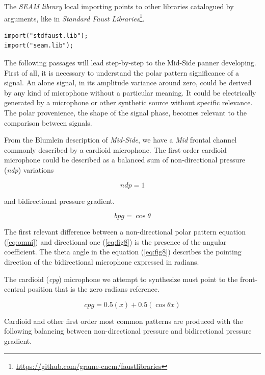 \documentclass{article}
\begin{document}
The \emph{SEAM library} local importing points to other libraries catalogued
by arguments, like in \emph{Standard Faust Libraries}\footnote{
\url{https://github.com/grame-cncm/faustlibraries}}.

\begin{lstlisting}
import("stdfaust.lib");
import("seam.lib");
\end{lstlisting}

The following passages will lead step-by-step to the Mid-Side panner developing. First of all, it is necessary to understand the polar pattern significance of a signal. An alone signal, in its amplitude variance around zero, could be derived by any kind of microphone without a particular meaning. It could be electrically generated by a microphone or other synthetic source without specific relevance. The polar provenience, the shape of the signal phase, becomes relevant to the comparison between signals.

From the Blumlein description of \emph{Mid-Side}, we have a \emph{Mid} frontal channel commonly described by a cardioid microphone. The first-order cardioid microphone could be described as a balanced sum of non-directional pressure (\emph{ndp}) variations

\begin{equation}
ndp = 1
\label{eq:omni}
\end{equation}

and bidirectional pressure gradient.

\begin{equation}
bpg = \cos\theta
\label{eq:fig8}
\end{equation}

The first relevant difference between a non-directional polar pattern equation (\ref{eq:omni}) and directional one (\ref{eq:fig8}) is the presence of the angular coefficient. The theta angle in the equation (\ref{eq:fig8}) describes the pointing direction of the bidirectional microphone expressed in radians.

The cardioid (\emph{cpg}) microphone we attempt to synthesize must point to the front-central position that is the zero radians reference.

\begin{equation}
cpg = 0.5(x) + 0.5(\cos\theta x)
\label{eq:fig8}
\end{equation}

Cardioid and other first order most common patterns are produced with the following balancing between non-directional pressure and bidirectional pressure gradient.
\end{document}
